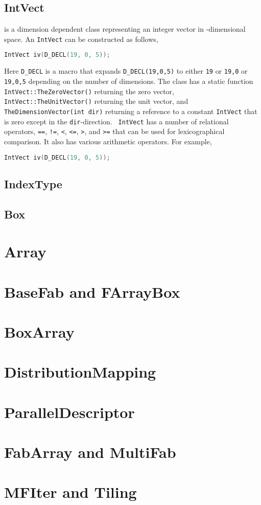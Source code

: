 \subsection{IntVect}

{} is a dimension dependent class representing an
integer vector in {}-dimensional space.  An
{\tt IntVect} can be constructed as follows,
\begin{lstlisting}[language=cpp]
    IntVect iv(D_DECL(19, 0, 5));
\end{lstlisting}
Here {\tt D\_DECL} is a macro that expands {\tt D\_DECL(19,0,5)} to
either {\tt 19} or {\tt 19,0} or {\tt 19,0,5} depending on the number
of dimensions.  The class has a static function {\tt
  IntVect::TheZeroVector()} returning the zero vector, {\tt
  IntVect::TheUnitVector()} returning the unit vector, and {\tt
  TheDimensionVector(int dir)} returning a reference to a constant
{\tt IntVect} that is zero except in the {\tt dir}-direction.  {\tt
  IntVect} has a number of relational operators, {\tt ==}, {\tt !=},
{\tt <}, {\tt <=}, {\tt >}, and {\tt >=} that can be used for
lexicographical comparison.  It also has various arithmetic operators.
For example,
\begin{lstlisting}[language=cpp]
    IntVect iv(D_DECL(19, 0, 5));
\end{lstlisting}


\subsection{IndexType}

\subsection{Box}


\section{Array}

\section{BaseFab and FArrayBox}

\section{BoxArray}

\section{DistributionMapping}

\section{ParallelDescriptor}

\section{FabArray and MultiFab}

\section{MFIter and Tiling}

